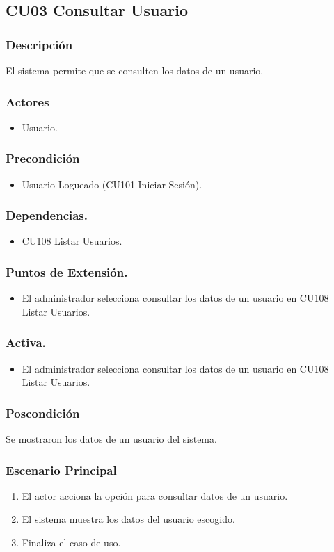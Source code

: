 \subsection{CU03 Consultar Usuario}
\subsubsection{Descripci\'{o}n}
El sistema permite que se consulten los datos de un usuario.
\subsubsection{Actores}
\begin{itemize}
\item Usuario.
\end{itemize}
\subsubsection{Precondici\'{o}n}
\begin{itemize}
\item Usuario Logueado (CU101 Iniciar Sesi\'{o}n).
\end{itemize}
\subsubsection{Dependencias.}
\begin{itemize}
\item CU108 Listar Usuarios.
\end{itemize}
\subsubsection{Puntos de Extensi\'{o}n.}
\begin{itemize}
\item El administrador selecciona consultar los datos de un usuario en CU108 Listar Usuarios.
\end{itemize}
\subsubsection{Activa.}
\begin{itemize}
\item El administrador selecciona consultar los datos de un usuario en CU108 Listar Usuarios.
\end{itemize}
\subsubsection{Poscondici\'{o}n}
Se mostraron los datos de un usuario del sistema.
\subsubsection{Escenario Principal}
\begin{enumerate}
\item El actor acciona la opci\'{o}n para consultar datos de un usuario.
\item El sistema muestra los datos del usuario escogido.
\item Finaliza el caso de uso.
\end{enumerate}